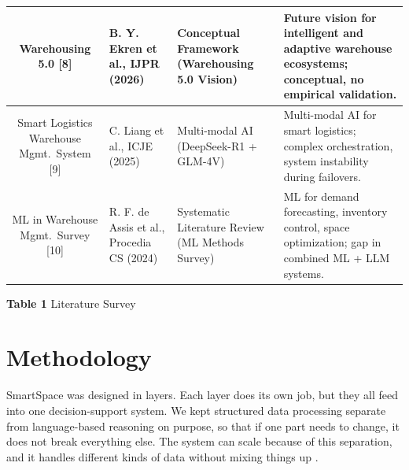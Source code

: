 \documentclass[pdflatex,sn-mathphys-num]{sn-jnl}
\theoremstyle{thmstyleone}
\theoremstyle{thmstyletwo}
\theoremstyle{thmstylethree}
\begin{document}
\begin{table}[h]
\begin{tabular}{|c|p{4cm}|p{3cm}|p{4cm}|}
Warehousing 5.0 [8]
  & B. Y. Ekren et al., IJPR (2026)
  & Conceptual Framework
    (Warehousing 5.0 Vision)
  & Future vision for intelligent and adaptive
    warehouse ecosystems;
    conceptual, no empirical validation. \\
\hline

Smart Logistics Warehouse Mgmt.\ System [9]
  & C. Liang et al., ICJE (2025)
  & Multi-modal AI
    (DeepSeek-R1 + GLM-4V)
  & Multi-modal AI for smart logistics;
    complex orchestration,
    system instability during failovers. \\
\hline

ML in Warehouse Mgmt.\ Survey [10]
  & R. F. de Assis et al.,
    Procedia CS (2024)
  & Systematic Literature Review
    (ML Methods Survey)
  & ML for demand forecasting, inventory control,
    space optimization;
    gap in combined ML + LLM systems. \\
\hline
\end{tabular}
\begin{center}
    \textbf{Table 1} Literature Survey
\end{center}
\end{table}


\section{Methodology}\label{sec3}

SmartSpace was designed in layers.
Each layer does its own job, but they all feed into one
decision-support system.
We kept structured data processing separate from
language-based reasoning on purpose, so that if one part
needs to change, it does not break everything else.
The system can scale because of this separation,
and it handles different kinds of data without mixing
things up \cite{b4, b9}.
\end{document}
